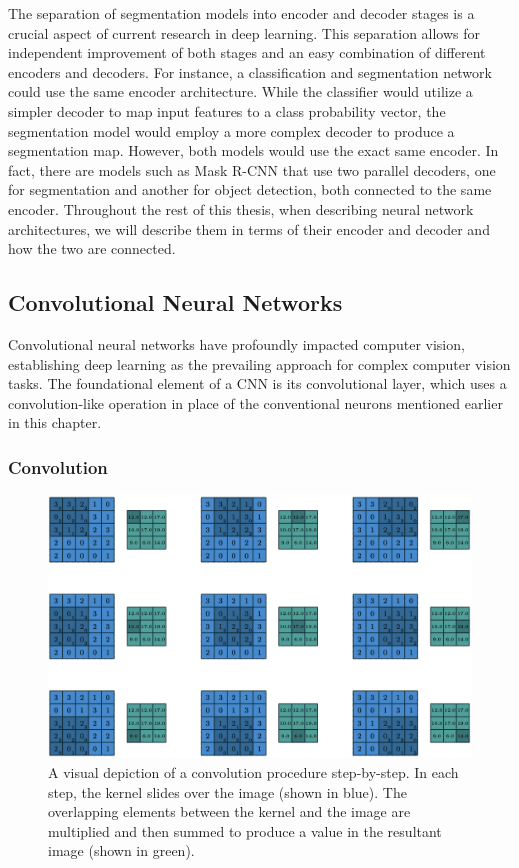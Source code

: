 The separation of segmentation models into encoder and decoder stages is a crucial aspect of current research in deep learning. This separation allows for independent improvement of both stages and an easy combination of different encoders and decoders. For instance, a classification and segmentation network could use the same encoder architecture. While the classifier would utilize a simpler decoder to map input features to a class probability vector, the segmentation model would employ a more complex decoder to produce a segmentation map. However, both models would use the exact same encoder. In fact, there are models such as Mask R-CNN \cite{heMaskRCNN2017b} that use two parallel decoders, one for segmentation and another for object detection, both connected to the same encoder. Throughout the rest of this thesis, when describing neural network architectures, we will describe them in terms of their encoder and decoder and how the two are connected.

\subsection{Convolutional Neural Networks}

Convolutional neural networks have profoundly impacted computer vision, establishing deep learning as the prevailing approach for complex computer vision tasks. The foundational element of a CNN is its convolutional layer, which uses a convolution-like operation in place of the conventional neurons mentioned earlier in this chapter.

\subsubsection{Convolution}

\begin{figure}[b!]
 \centering
 \includegraphics[width=\linewidth]{images/convolution-explainer.png}
 \caption{A visual depiction of a convolution procedure step-by-step. In each step, the kernel slides over the image (shown in blue). The overlapping elements between the kernel and the image are multiplied and then summed to produce a value in the resultant image (shown in green). \cite{dumoulinGuideConvolutionArithmetic2018}}
 \label{fig:convolution-explanation}
 \end{figure}

